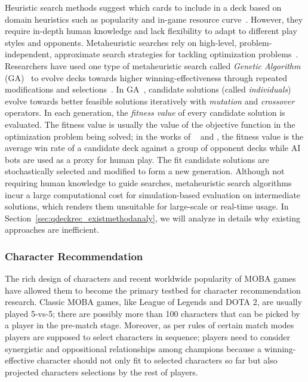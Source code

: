 
Heuristic search methods suggest which cards to include in a deck based on domain heuristics such as popularity and in-game resource curve~\citep{frankkarsten,willfancher,stiegler2016hearthstone}. However, they require in-depth human knowledge and lack flexibility to adapt to different play styles and opponents. Metaheuristic searches rely on high-level, problem-independent, approximate search strategies for tackling optimization problems~\citep{birattari2009tuning}. Researchers have used one type of metaheuristic search called \textit{Genetic Algorithm} (GA)~\citep{holland1992adaptation} to evolve decks towards higher winning-effectiveness through repeated modifications and selections~\citep{garcia2016evolutionary,bjorke2017deckbuilding}. In GA~\citep{holland1992adaptation}, candidate solutions (called \textit{individuals}) evolve towards better feasible solutions iteratively with \textit{mutation} and \textit{crossover} operators. In each generation, the \textit{fitness value} of every candidate solution is evaluated. The fitness value is usually the value of the objective function in the optimization problem being solved; in the works of ~\textcite{garcia2016evolutionary} and \textcite{bjorke2017deckbuilding}, the fitness value is the average win rate of a candidate deck against a group of opponent decks while AI bots are used as a proxy for human play. The fit candidate solutions are stochastically selected and modified to form a new generation. Although not requiring human knowledge to guide searches, metaheuristic search algorithms incur a large computational cost for simulation-based evaluation on intermediate solutions, which renders them unsuitable for large-scale or real-time usage. In Section~\ref{sec:qdeckrec_existmethodanaly}, we will analyze in details why existing approaches are inefficient.

\subsubsection{Character Recommendation}\label{sec:rw_character}
The rich design of characters and recent worldwide popularity of MOBA games have allowed them to become the primary testbed for character recommendation research. Classic MOBA games, like League of Legends and DOTA 2, are usually played 5-vs-5; there are possibly more than 100 characters that can be picked by a player in the pre-match stage. Moreover, as per rules of certain match modes players are supposed to select characters in sequence; players need to consider synergistic and oppositional relationships among champions because a winning-effective character should not only fit to selected characters so far but also projected characters selections by the rest of players. 

